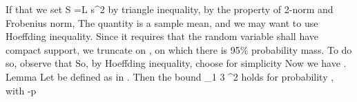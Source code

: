 If that we set
 {
\NC S
=\NC L s^2 \NR
}
by triangle inequality, by the property of 2-norm and Frobenius norm,
%
%
The quantity  is a sample mean, and we may want to use Hoeffding inequality.
Since it requires that the random variable shall have compact support, we truncate  on , on which there is 95\% probability mass.
%
To do so, observe that
%
So, by Hoeffding inequality, choose for simplicity
%
 {
\NC {} 
\leq {} \exp {} \NR
}
%
Now we have .
%
\Result
{Lemma}
{
Let  be defined as in .
Then the bound
%
 {
\NC {} _1
\leq \NC {} {3} ^2 \NR
}
%
holds for probability , with
%
 {
 -p
\leq {} \exp {} \NR
}
}

\stopsubsection
\stopsection

